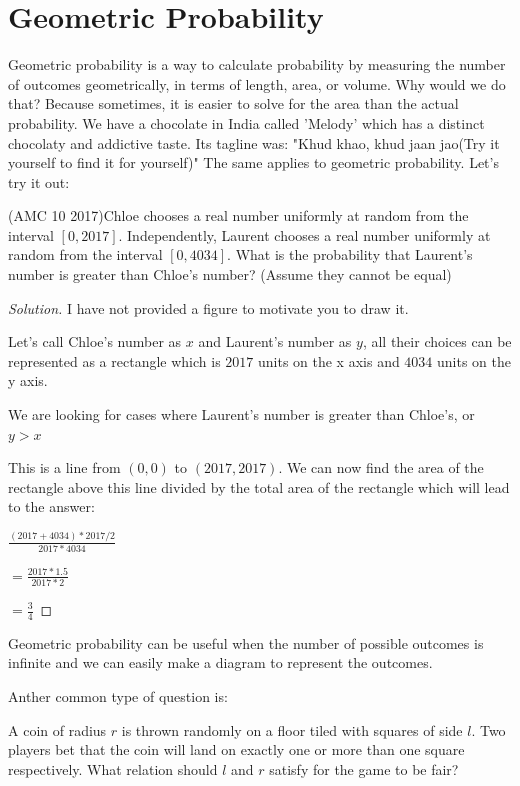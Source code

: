\section{Geometric Probability}
Geometric probability is a way to calculate probability by measuring 
the number of outcomes geometrically, in terms of length, area, or volume. 
Why would we do that? Because sometimes, it is easier to solve for the area than 
the actual probability. We have a chocolate in India called 'Melody' which 
has a distinct chocolaty and addictive taste. Its tagline was: 
"Khud khao, khud jaan jao(Try it yourself to find it for yourself)" The same 
applies to geometric probability. Let's try it out:
\begin{example}
    (AMC 10 2017)Chloe chooses a real number uniformly at random from the 
    interval $[0, 2017]$. Independently, Laurent chooses a real number uniformly 
    at random from the interval $[0, 4034]$. What is the probability that Laurent’s 
    number is greater than Chloe’s number? (Assume they cannot be equal)
\end{example}
\begin{proof}
    [Solution]
    I have not provided a figure to motivate you to draw it.\par
    Let's call Chloe's number as $x$ and Laurent's number as $y$, all their choices can be 
    represented as a rectangle which is $2017$ units on the x axis and $4034$ units on the y axis. \par
    We are looking for cases where Laurent's number is greater than Chloe's, or $y>x$\par
    This is a line from $(0,0)$ to $(2017,2017)$. We can now find the area of the 
    rectangle above this line divided by the total area of the rectangle which will lead to the answer:\par
    $\frac{(2017+4034)*2017/2}{2017*4034}$\par
    $=\frac{2017*1.5}{2017*2}$\par
    $=\frac{3}{4}$
\end{proof}
Geometric probability can be useful when the number of possible outcomes is infinite and we can 
easily make a diagram to represent the outcomes.\par
Anther common type of question is:\par
\begin{example}
    A coin of radius $r$ is thrown randomly on a floor tiled with squares of side $l$. Two 
    players bet that the coin will land on exactly one or more than one square respectively. 
    What relation should $l$ and $r$ satisfy for the game to be fair? 
\end{example}
